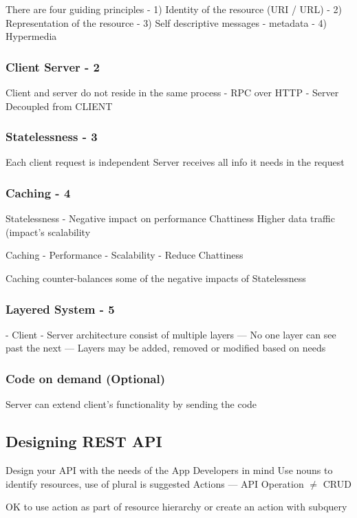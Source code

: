 There are four guiding principles
- 1) Identity of the resource (URI / URL)
- 2) Representation of the resource
- 3) Self descriptive messages - metadata
- 4) Hypermedia

\subsubsection{Client Server - 2}
Client and server do not reside in the same process
- RPC over HTTP
- Server Decoupled from CLIENT

\subsubsection{Statelessness - 3}
Each client request is independent
Server receives all info it needs in the request

\subsubsection{Caching - 4}
Statelessness - Negative impact on performance
Chattiness
Higher data traffic (impact's scalability

Caching - Performance
- Scalability
- Reduce Chattiness

Caching counter-balances some of the negative impacts of Statelessness

\subsubsection{Layered System - 5}
- Client - Server architecture consist of multiple layers
--- No one layer can see past the next
--- Layers may be added, removed or modified based on needs

\subsubsection{Code on demand (Optional)}
Server can extend client's functionality by sending the code

\subsection{Designing REST API}
Design your API with the needs of the App Developers in mind
Use nouns to identify resources, use of plural is suggested
Actions
--- API Operation $ \neq $ CRUD

OK to use action as part of resource hierarchy or create an action with subquery

